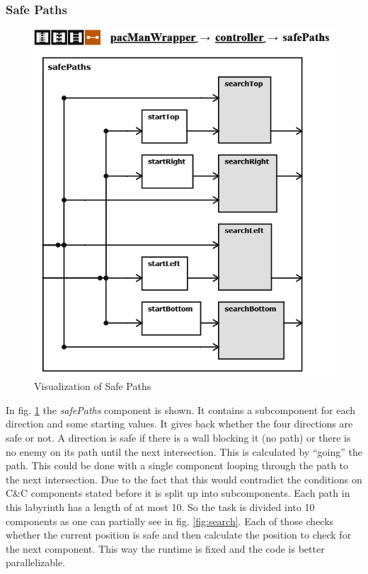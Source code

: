 \newpage
\subsubsection{Safe Paths}
\begin{figure}
	\label{fig:safePaths}
	\centering
	\includegraphics[scale=0.75]{pictures/PacMan/safePaths.png}
	\caption{Visualization of Safe Paths}
\end{figure}
In fig. \ref{fig:safePaths} the \textit{safePaths} component is shown. It contains a subcomponent for each direction and some starting values. It gives back whether the four directions are safe or not. A direction is safe if there is a wall blocking it (no path) or there is no enemy on its path until the next intersection. This is calculated by ``going'' the path. This could be done with a single component looping through the path to the next intersection. Due to the fact that this would contradict the conditions on C\&C components stated before it is split up into subcomponents. Each path in this labyrinth has a length of at most 10. So the task is divided into 10 components as one can partially see in fig. \ref{fig:search}. Each of those checks whether the current position is safe and then calculate the position to check for the next component. This way the runtime is fixed and the code is better parallelizable.
